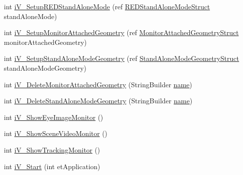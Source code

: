\begin{DoxyCompactItemize}
\item 
int \hyperlink{class_web_analyzer_1_1_eye_tracking_1_1_eye_tracking_controller_a85ba347804e51382c0a551058f135051}{i\+V\+\_\+\+Setup\+R\+E\+D\+Stand\+Alone\+Mode} (ref \hyperlink{struct_web_analyzer_1_1_eye_tracking_1_1_eye_tracking_controller_1_1_r_e_d_stand_alone_mode_struct}{R\+E\+D\+Stand\+Alone\+Mode\+Struct} stand\+Alone\+Mode)
\item 
int \hyperlink{class_web_analyzer_1_1_eye_tracking_1_1_eye_tracking_controller_ab1eb1465d39dd6bcb15f9f980ea03e1d}{i\+V\+\_\+\+Setup\+Monitor\+Attached\+Geometry} (ref \hyperlink{struct_web_analyzer_1_1_eye_tracking_1_1_eye_tracking_controller_1_1_monitor_attached_geometry_struct}{Monitor\+Attached\+Geometry\+Struct} monitor\+Attached\+Geometry)
\item 
int \hyperlink{class_web_analyzer_1_1_eye_tracking_1_1_eye_tracking_controller_ac0619c7f7a5647b6331faf2c9b4af4de}{i\+V\+\_\+\+Setup\+Stand\+Alone\+Mode\+Geometry} (ref \hyperlink{struct_web_analyzer_1_1_eye_tracking_1_1_eye_tracking_controller_1_1_stand_alone_mode_geometry_struct}{Stand\+Alone\+Mode\+Geometry\+Struct} stand\+Alone\+Mode\+Geometry)
\item 
int \hyperlink{class_web_analyzer_1_1_eye_tracking_1_1_eye_tracking_controller_af7e4be514e9e2e959af14405a66b7c36}{i\+V\+\_\+\+Delete\+Monitor\+Attached\+Geometry} (String\+Builder \hyperlink{_u_i_2_h_t_m_l_resources_2js_2src_2create__experiment_8js_adac2bcb4f01b574cbc63fe8ee2c56bf0}{name})
\item 
int \hyperlink{class_web_analyzer_1_1_eye_tracking_1_1_eye_tracking_controller_a86944dc9263c6c4d361e45303eac8797}{i\+V\+\_\+\+Delete\+Stand\+Alone\+Mode\+Geometry} (String\+Builder \hyperlink{_u_i_2_h_t_m_l_resources_2js_2src_2create__experiment_8js_adac2bcb4f01b574cbc63fe8ee2c56bf0}{name})
\item 
int \hyperlink{class_web_analyzer_1_1_eye_tracking_1_1_eye_tracking_controller_a04ec1cade03ec615b060a6fbd14b8d59}{i\+V\+\_\+\+Show\+Eye\+Image\+Monitor} ()
\item 
int \hyperlink{class_web_analyzer_1_1_eye_tracking_1_1_eye_tracking_controller_a2133a08cfa9abd6180695173a21043d8}{i\+V\+\_\+\+Show\+Scene\+Video\+Monitor} ()
\item 
int \hyperlink{class_web_analyzer_1_1_eye_tracking_1_1_eye_tracking_controller_aaa41b196f8226f9dd2b55b1c23c5c702}{i\+V\+\_\+\+Show\+Tracking\+Monitor} ()
\item 
int \hyperlink{class_web_analyzer_1_1_eye_tracking_1_1_eye_tracking_controller_a2185bc1fe6c8890b262e01b190b89b4f}{i\+V\+\_\+\+Start} (int et\+Application)

\end{DoxyCompactItemize}
